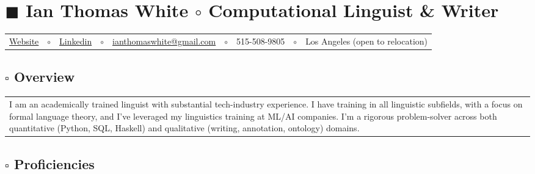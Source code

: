 \documentclass[10pt]{article}
\begin{document}
\thispagestyle{empty}

\section*{$\blacksquare$ \hspace{1em} Ian Thomas White \hspace{1em} $\circ$ \hspace{1em} Computational Linguist \& Writer}

\vspace{-1em}

\leftbar[0.99\linewidth]

\begin{tabular}{lllllllll}
      \href{https://www.ianthomaswhite.com}{Website} & $\circ$ & \href{https://www.linkedin.com/in/ianthomaswhite/}{Linkedin}& $\circ$ & \href{mailto:ianthomaswhite@gmail.com}{ianthomaswhite@gmail.com} & $\circ$ & 515-508-9805 & $\circ$ & Los Angeles (open to relocation)\\
\end{tabular}

\endleftbar

\subsection*{$\square$ \hspace{1.4em} Overview}

\vspace{-1em}

\leftbar[0.99\linewidth]

\begin{tabularx}{\textwidth}{X}
    I am an academically trained linguist with substantial tech-industry experience. I have training in all linguistic subfields, with a focus on formal language theory, and I've leveraged my linguistics training at ML/AI companies. I'm a rigorous problem-solver across both quantitative (Python, SQL, Haskell) and qualitative (writing, annotation, ontology) domains. \\
\end{tabularx}

\endleftbar

\subsection*{$\square$ \hspace{1.4em} Proficiencies}

\vspace{-1em}
\end{document}
